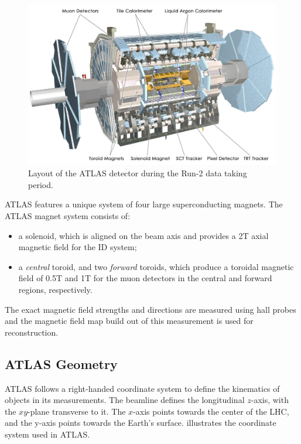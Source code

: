 \begin{figure}[!ht]
    \centering
    \includegraphics[width=0.8\linewidth]{figures/experiment/ATLAS-Run2.jpg}
    \caption{Layout of the ATLAS detector during the Run-2 data taking period.~\cite{Pequenao:1095924}}
    \label{fig:atlas-layout}
\end{figure}

ATLAS features a unique system of four large superconducting magnets. The ATLAS magnet system consists of:
\begin{itemize}
    \item a solenoid, which is aligned on the beam axis and provides a 2T axial magnetic field for the ID system;
    \item a \textit{central} toroid, and two \textit{forward} toroids, which produce a toroidal magnetic field of 0.5T and 1T for the muon detectors in the central and forward regions, respectively.
\end{itemize}

The exact magnetic field strengths and directions are measured using hall probes and the magnetic field map build out of this measurement is used for reconstruction.

\subsection{ATLAS Geometry}

ATLAS follows a right-handed coordinate system to define the kinematics of objects in its measurements. The beamline defines the longitudinal $z$-axis, with the $xy$-plane transverse to it. The $x$-axis points towards the center of the LHC, and the y-axis points towards the Earth's surface.  illustrates the coordinate system used in ATLAS. 

